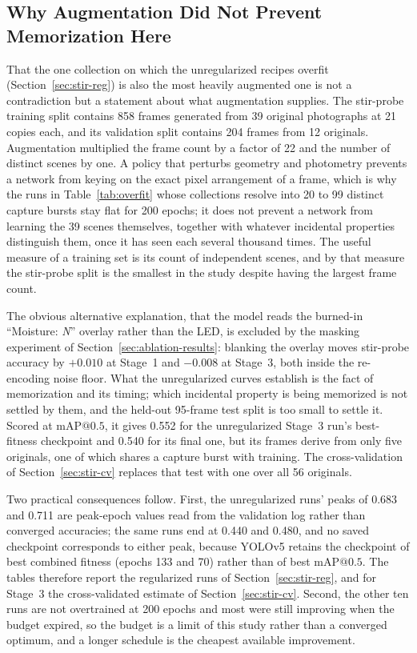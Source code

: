 ﻿\documentclass[journal]{IEEEtran}
\begin{document}
\subsection{Why Augmentation Did Not Prevent Memorization Here}
\label{sec:aug-limits}
That the one collection on which the unregularized recipes overfit (Section~\ref{sec:stir-reg}) is also the most heavily augmented one is not a contradiction but a statement about what augmentation supplies. The stir-probe training split contains 858 frames generated from 39 original photographs at 21 copies each, and its validation split contains 204 frames from 12 originals. Augmentation multiplied the frame count by a factor of 22 and the number of distinct scenes by one. A policy that perturbs geometry and photometry prevents a network from keying on the exact pixel arrangement of a frame, which is why the runs in Table~\ref{tab:overfit} whose collections resolve into 20 to 99 distinct capture bursts stay flat for 200 epochs; it does not prevent a network from learning the 39 scenes themselves, together with whatever incidental properties distinguish them, once it has seen each several thousand times. The useful measure of a training set is its count of independent scenes, and by that measure the stir-probe split is the smallest in the study despite having the largest frame count.

The obvious alternative explanation, that the model reads the burned-in ``Moisture: \emph{N}'' overlay rather than the LED, is excluded by the masking experiment of Section~\ref{sec:ablation-results}: blanking the overlay moves stir-probe accuracy by $+0.010$ at Stage~1 and $-0.008$ at Stage~3, both inside the re-encoding noise floor. What the unregularized curves establish is the fact of memorization and its timing; which incidental property is being memorized is not settled by them, and the held-out 95-frame test split is too small to settle it. Scored at $\text{mAP@0.5}$, it gives 0.552 for the unregularized Stage~3 run's best-fitness checkpoint and 0.540 for its final one, but its frames derive from only five originals, one of which shares a capture burst with training. The cross-validation of Section~\ref{sec:stir-cv} replaces that test with one over all 56 originals.

Two practical consequences follow. First, the unregularized runs' peaks of 0.683 and 0.711 are peak-epoch values read from the validation log rather than converged accuracies; the same runs end at 0.440 and 0.480, and no saved checkpoint corresponds to either peak, because YOLOv5 retains the checkpoint of best combined fitness (epochs 133 and 70) rather than of best $\text{mAP@0.5}$. The tables therefore report the regularized runs of Section~\ref{sec:stir-reg}, and for Stage~3 the cross-validated estimate of Section~\ref{sec:stir-cv}. Second, the other ten runs are not overtrained at 200 epochs and most were still improving when the budget expired, so the budget is a limit of this study rather than a converged optimum, and a longer schedule is the cheapest available improvement.
\end{document}
